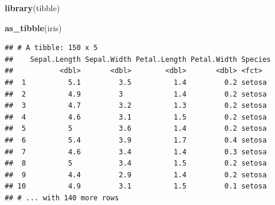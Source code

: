 \documentclass[ignorenonframetext,]{beamer}
\newenvironment{Shaded}{\begin{snugshade}}{\end{snugshade}}
\newcommand{\KeywordTok}[1]{\textcolor[rgb]{0.13,0.29,0.53}{\textbf{#1}}}
\newcommand{\NormalTok}[1]{#1}
\begin{document}
\begin{frame}[fragile]{}
\protect\hypertarget{section-1}{}


\small

\begin{Shaded}
\begin{Highlighting}[]
\KeywordTok{library}\NormalTok{(tibble)}

\KeywordTok{as_tibble}\NormalTok{(iris)}
\end{Highlighting}
\end{Shaded}

\begin{verbatim}
## # A tibble: 150 x 5
##    Sepal.Length Sepal.Width Petal.Length Petal.Width Species
##           <dbl>       <dbl>        <dbl>       <dbl> <fct>  
##  1          5.1         3.5          1.4         0.2 setosa 
##  2          4.9         3            1.4         0.2 setosa 
##  3          4.7         3.2          1.3         0.2 setosa 
##  4          4.6         3.1          1.5         0.2 setosa 
##  5          5           3.6          1.4         0.2 setosa 
##  6          5.4         3.9          1.7         0.4 setosa 
##  7          4.6         3.4          1.4         0.3 setosa 
##  8          5           3.4          1.5         0.2 setosa 
##  9          4.4         2.9          1.4         0.2 setosa 
## 10          4.9         3.1          1.5         0.1 setosa 
## # ... with 140 more rows
\end{verbatim}

\normalsize

\end{frame}
\end{document}
